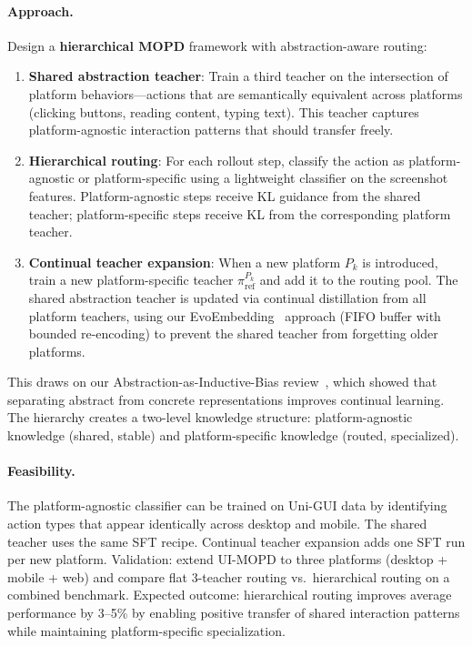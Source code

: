 \documentclass[11pt,a4paper]{article}
\begin{document}
\paragraph{Approach.} Design a \textbf{hierarchical MOPD} framework with abstraction-aware routing:
\begin{enumerate}
\item \textbf{Shared abstraction teacher}: Train a third teacher on the intersection of platform behaviors---actions that are semantically equivalent across platforms (clicking buttons, reading content, typing text). This teacher captures platform-agnostic interaction patterns that should transfer freely.
\item \textbf{Hierarchical routing}: For each rollout step, classify the action as platform-agnostic or platform-specific using a lightweight classifier on the screenshot features. Platform-agnostic steps receive KL guidance from the shared teacher; platform-specific steps receive KL from the corresponding platform teacher.
\item \textbf{Continual teacher expansion}: When a new platform $P_k$ is introduced, train a new platform-specific teacher $\pi_{\mathrm{ref}}^{P_k}$ and add it to the routing pool. The shared abstraction teacher is updated via continual distillation from all platform teachers, using our EvoEmbedding~\cite{evoembedding2026} approach (FIFO buffer with bounded re-encoding) to prevent the shared teacher from forgetting older platforms.
\end{enumerate}
This draws on our Abstraction-as-Inductive-Bias review~\cite{abstraction2026}, which showed that separating abstract from concrete representations improves continual learning. The hierarchy creates a two-level knowledge structure: platform-agnostic knowledge (shared, stable) and platform-specific knowledge (routed, specialized).

\paragraph{Feasibility.} The platform-agnostic classifier can be trained on Uni-GUI data by identifying action types that appear identically across desktop and mobile. The shared teacher uses the same SFT recipe. Continual teacher expansion adds one SFT run per new platform. Validation: extend UI-MOPD to three platforms (desktop + mobile + web) and compare flat 3-teacher routing vs.\ hierarchical routing on a combined benchmark. Expected outcome: hierarchical routing improves average performance by 3--5\% by enabling positive transfer of shared interaction patterns while maintaining platform-specific specialization.
\end{document}
